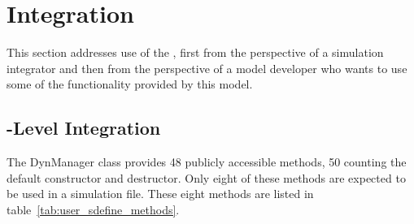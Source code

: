 \section{Integration}\label{sec:user_integration}
This section addresses use of the \ModelDesc, first from the perspective of
a simulation integrator and then from the perspective of a model developer
who wants to use some of the functionality provided by this model.

\subsection{\Sdefine-Level Integration}

The DynManager class provides 48 publicly accessible methods, 50 counting
the default constructor and destructor. Only eight of these methods are expected
to be used in a simulation \Sdefine file. These eight methods are listed in
table~\ref{tab:user_sdefine_methods}.

